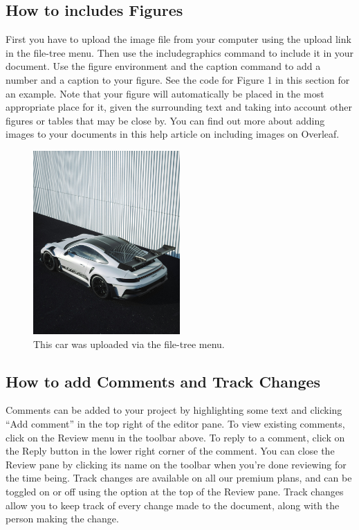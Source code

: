 \documentclass{article}
\begin{document}
	\subsection{ How to includes Figures}
	First you have to upload the image file from your computer using the upload link in the file-tree menu.
	Then use the includegraphics command to include it in your document. Use the figure environment
	and the caption command to add a number and a caption to your figure. See the code for Figure 1 in
	this section for an example.
	Note that your figure will automatically be placed in the most appropriate place for it, given the
	surrounding text and taking into account other figures or tables that may be close by. You can find
	out more about adding images to your documents in this help article on including images on Overleaf.
	
	
		\begin{figure}
		\centering
		\includegraphics[width=0.5\textwidth]{image2}
		\caption{This car was uploaded via the file-tree menu. }
		\label{fig:example}
	\end{figure}
	
	\subsection{How to add Comments and Track Changes}
	
	Comments can be added to your project by highlighting some text and clicking “Add comment” in
	the top right of the editor pane. To view existing comments, click on the Review menu in the toolbar
	above. To reply to a comment, click on the Reply button in the lower right corner of the comment.
	You can close the Review pane by clicking its name on the toolbar when you’re done reviewing for the
	time being.
	Track changes are available on all our premium plans, and can be toggled on or off using the option
	at the top of the Review pane. Track changes allow you to keep track of every change made to the
	document, along with the person making the change.
	
\end{document}
